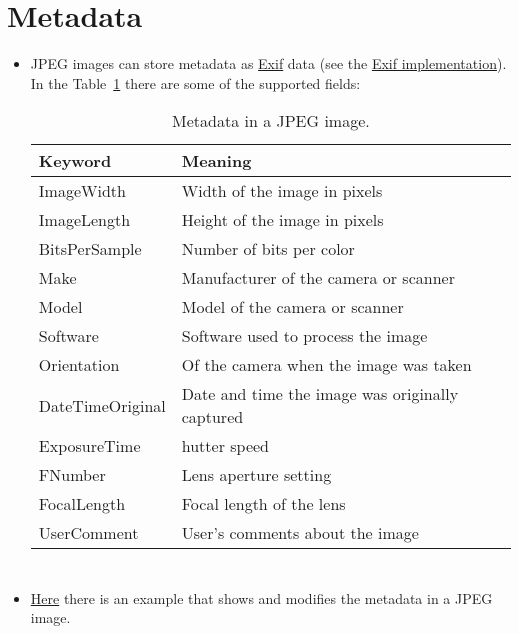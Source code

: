 \section{Metadata}
\begin{itemize}
\item \gls{JPEG} images can store metadata as
  \href{https://en.wikipedia.org/wiki/Exif}{Exif} data (see the
  \href{https://gitlab.com/TNThieding/exif/-/blob/master/docs/api_reference.rst?ref_type=heads}{Exif
    implementation}). In the Table~\ref{tab:JPEG_metadata} there are
  some of the supported fields:
  \begin{table}[!h]
    \vspace{2ex}
    \begin{center}
      \begin{tabular}{l|l}
        Keyword & Meaning\\
        \hline
        ImageWidth & Width of the image in pixels \\
        ImageLength & Height of the image in pixels \\
        BitsPerSample&  Number of bits per color \\
        Make & Manufacturer of the camera or scanner \\
        Model & Model of the camera or scanner \\
        Software & Software used to process the image \\
        Orientation & Of the camera when the image was taken \\
        DateTimeOriginal & Date and time the image was originally captured \\
        ExposureTime & hutter speed \\
        FNumber & Lens aperture setting \\
        FocalLength & Focal length of the lens \\
        UserComment & User's comments about the image
      \end{tabular}
    \end{center}
    \caption{Metadata in a JPEG image.}
    \label{tab:JPEG_metadata}
  \end{table}
\end{itemize}

\section*{}
\begin{itemize}
\item
  \href{https://github.com/vicente-gonzalez-ruiz/medical_imaging/blob/main/notebooks/JPEG_add_metadata.ipynb}{Here}
  there is an example that shows and modifies the metadata in a JPEG
  image.
\end{itemize}
